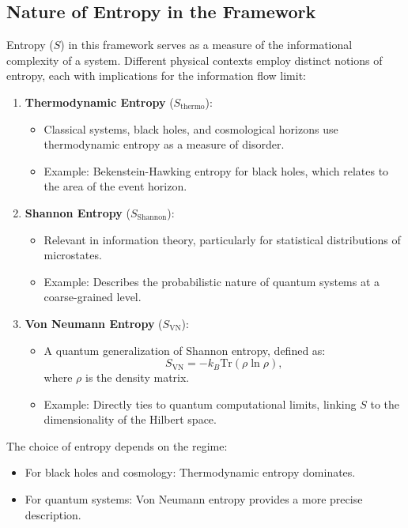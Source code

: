 \documentclass[12pt]{article}
\begin{document}
\subsection{Nature of Entropy in the Framework}
Entropy (\( S \)) in this framework serves as a measure of the informational complexity of a system. Different physical contexts employ distinct notions of entropy, each with implications for the information flow limit:
\begin{enumerate}
    \item \textbf{Thermodynamic Entropy} (\( S_{\text{thermo}} \)):
    \begin{itemize}
        \item Classical systems, black holes, and cosmological horizons use thermodynamic entropy as a measure of disorder.
        \item Example: Bekenstein-Hawking entropy for black holes, which relates to the area of the event horizon.
    \end{itemize}
    \item \textbf{Shannon Entropy} (\( S_{\text{Shannon}} \)):
    \begin{itemize}
        \item Relevant in information theory, particularly for statistical distributions of microstates.
        \item Example: Describes the probabilistic nature of quantum systems at a coarse-grained level.
    \end{itemize}
    \item \textbf{Von Neumann Entropy} (\( S_{\text{VN}} \)):
    \begin{itemize}
        \item A quantum generalization of Shannon entropy, defined as:
        \[
        S_{\text{VN}} = -k_B \text{Tr}(\rho \ln \rho),
        \]
        where \( \rho \) is the density matrix.
        \item Example: Directly ties to quantum computational limits, linking \( S \) to the dimensionality of the Hilbert space.
    \end{itemize}
\end{enumerate}

The choice of entropy depends on the regime:
\begin{itemize}
    \item For black holes and cosmology: Thermodynamic entropy dominates.
    \item For quantum systems: Von Neumann entropy provides a more precise description.
\end{itemize}
\end{document}
